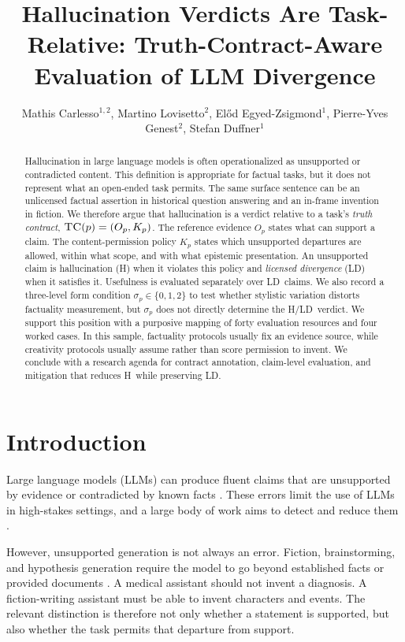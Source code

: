 \documentclass{clv2025}
\title{Hallucination Verdicts Are Task-Relative: Truth-Contract-Aware Evaluation of LLM Divergence}
\author{Mathis Carlesso$^{1,2}$, Martino Lovisetto$^{2}$, El\H{o}d Egyed-Zsigmond$^{1}$, Pierre-Yves Genest$^{2}$, Stefan Duffner$^{1}$}
\affil{$^{1}$INSA Lyon, CNRS, LIRIS, UMR5205, Universit\'e Claude Bernard Lyon 1, 69621 Villeurbanne, France\\
  \quad \email{mathis.carlesso@insa-lyon.fr}}
\affil{$^{2}$Alteca, 69100 Villeurbanne, France}
\newcommand{\TC}{\textsc{TC}}
\newcommand{\LD}{\textsc{LD}}
\newcommand{\Hall}{\textsc{H}}
\begin{document}
\maketitle

\begin{abstract}
Hallucination in large language models is often operationalized as unsupported or contradicted content.
This definition is appropriate for factual tasks, but it does not represent what an open-ended task permits.
The same surface sentence can be an unlicensed factual assertion in historical question answering and an in-frame invention in fiction.
We therefore argue that hallucination is a verdict relative to a task's \emph{truth contract}, $\TC(p)=(O_p,K_p)$.
The reference evidence $O_p$ states what can support a claim.
The content-permission policy $K_p$ states which unsupported departures are allowed, within what scope, and with what epistemic presentation.
An unsupported claim is hallucination (\Hall) when it violates this policy and \emph{licensed divergence} (\LD) when it satisfies it.
Usefulness is evaluated separately over \LD\ claims.
We also record a three-level form condition $\sigma_p\in\{0,1,2\}$ to test whether stylistic variation distorts factuality measurement, but $\sigma_p$ does not directly determine the \Hall/\LD\ verdict.
We support this position with a purposive mapping of forty evaluation resources and four worked cases.
In this sample, factuality protocols usually fix an evidence source, while creativity protocols usually assume rather than score permission to invent.
We conclude with a research agenda for contract annotation, claim-level evaluation, and mitigation that reduces \Hall\ while preserving \LD.
\end{abstract}

\section{Introduction}\label{sec:intro}

Large language models (LLMs) can produce fluent claims that are unsupported by evidence or contradicted by known facts \citep{ji_survey_2023,huang_survey_2025}.
These errors limit the use of LLMs in high-stakes settings, and a large body of work aims to detect and reduce them \citep{lin_truthfulqa_2022,li_halueval_2023,wei_measuring_2024}.

However, unsupported generation is not always an error.
Fiction, brainstorming, and hypothesis generation require the model to go beyond established facts or provided documents \citep{franceschelli_creativity_2024,jiang_survey_2024,sui_confabulation_2024}.
A medical assistant should not invent a diagnosis.
A fiction-writing assistant must be able to invent characters and events.
The relevant distinction is therefore not only whether a statement is supported, but also whether the task permits that departure from support.
\end{document}
